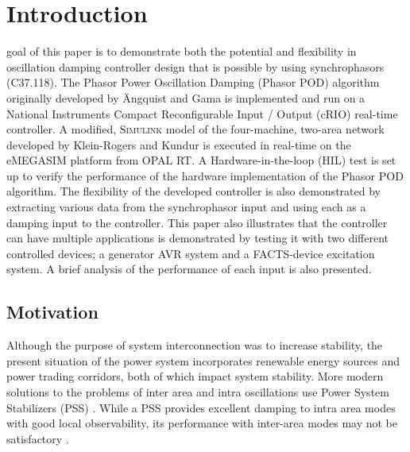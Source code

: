 \documentclass[journal]{IEEEtran}
\begin{document}
\section{Introduction}
% 
% 
% 
% 
 goal of this paper is to demonstrate both the potential and flexibility in oscillation damping controller design that is possible by using synchrophasors (C37.118). The Phasor Power Oscillation Damping (Phasor POD) algorithm originally developed by \"{A}ngquist and Gama\cite{PhasorPOD} is implemented and run on a National Instruments Compact Reconfigurable Input / Output (cRIO) real-time controller. A modified, \textsc{Simulink} model of the four-machine, two-area network developed by Klein-Rogers and Kundur \cite{KundurTwoArea} is executed in real-time on the eMEGASIM \cite{eMEGASIM} platform from OPAL RT. A Hardware-in-the-loop (HIL) test is set up to verify the performance of the hardware implementation of the Phasor POD algorithm. The flexibility of the developed controller is also demonstrated by extracting various data from the synchrophasor input and using each as a damping input to the controller. This paper also illustrates that the controller can have multiple applications is demonstrated by testing it with two different controlled devices; a generator AVR system and a FACTS-device excitation system. A brief analysis of the performance of each input is also presented.\\

\subsection{Motivation}

Although the purpose of system interconnection was to increase stability, the present situation of the power system incorporates renewable energy sources and power trading corridors, both of which impact system stability. More modern solutions to the problems of inter area and intra oscillations use Power System Stabilizers (PSS) \cite{Dmello}. While a PSS provides excellent damping to intra area modes with good local observability, its performance with inter-area modes may not be satisfactory \cite{localREMcomparison}.\\
\end{document}
